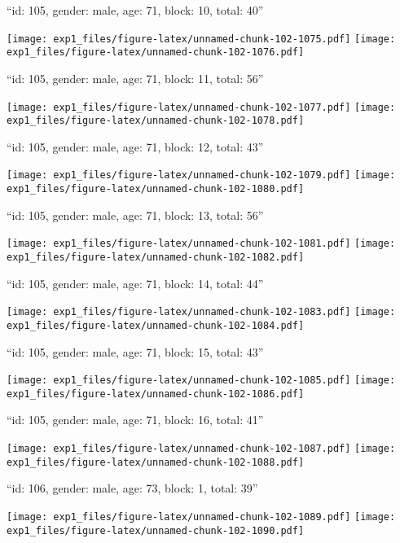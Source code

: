 \documentclass[11pt,,]{article}
\begin{document}
\newpage
[1] 

``id: 105, gender: male, age: 71, block: 10, total: 40''

\texttt{[image: exp1\_files/figure-latex/unnamed-chunk-102-1075.pdf]}
\texttt{[image: exp1\_files/figure-latex/unnamed-chunk-102-1076.pdf]}

\newpage
[1] 

``id: 105, gender: male, age: 71, block: 11, total: 56''

\texttt{[image: exp1\_files/figure-latex/unnamed-chunk-102-1077.pdf]}
\texttt{[image: exp1\_files/figure-latex/unnamed-chunk-102-1078.pdf]}

\newpage
[1] 

``id: 105, gender: male, age: 71, block: 12, total: 43''

\texttt{[image: exp1\_files/figure-latex/unnamed-chunk-102-1079.pdf]}
\texttt{[image: exp1\_files/figure-latex/unnamed-chunk-102-1080.pdf]}

\newpage
[1] 

``id: 105, gender: male, age: 71, block: 13, total: 56''

\texttt{[image: exp1\_files/figure-latex/unnamed-chunk-102-1081.pdf]}
\texttt{[image: exp1\_files/figure-latex/unnamed-chunk-102-1082.pdf]}

\newpage
[1] 

``id: 105, gender: male, age: 71, block: 14, total: 44''

\texttt{[image: exp1\_files/figure-latex/unnamed-chunk-102-1083.pdf]}
\texttt{[image: exp1\_files/figure-latex/unnamed-chunk-102-1084.pdf]}

\newpage
[1] 

``id: 105, gender: male, age: 71, block: 15, total: 43''

\texttt{[image: exp1\_files/figure-latex/unnamed-chunk-102-1085.pdf]}
\texttt{[image: exp1\_files/figure-latex/unnamed-chunk-102-1086.pdf]}

\newpage
[1] 

``id: 105, gender: male, age: 71, block: 16, total: 41''

\texttt{[image: exp1\_files/figure-latex/unnamed-chunk-102-1087.pdf]}
\texttt{[image: exp1\_files/figure-latex/unnamed-chunk-102-1088.pdf]}

\newpage
[1] 

``id: 106, gender: male, age: 73, block: 1, total: 39''

\texttt{[image: exp1\_files/figure-latex/unnamed-chunk-102-1089.pdf]}
\texttt{[image: exp1\_files/figure-latex/unnamed-chunk-102-1090.pdf]}
\end{document}
